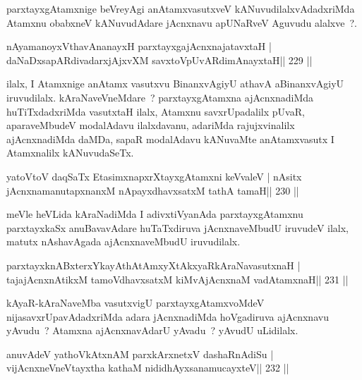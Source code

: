\begin{artha}
parxtayxgAtamxnige beVreyAgi anAtamxvasutxveV kANuvudilalxvAdadxriMda Atamxnu obabxneV kANuvudAdare jAcnxnavu apUNaRveV Aguvudu alalxve~?.
\end{artha}


\begin{shl}
nAyamanoyxV\s thavA\s nanayxH parxtayxgajAcnxnajatavxtaH |
daNaDxsapARdivadarxjAjxvXM savxtoV\s pUvARdimAnayxtaH\hfill || 229 ||
\end{shl}

\begin{artha}
ilalx, I Atamxnige anAtamx vasutxvu BinanxvAgiyU athavA aBinanxvAgiyU iruvudilalx. kAraNaveVneMdare~? parxtayxgAtamxna ajAcnxnadiMda huTiTxdadxriMda vasutxtaH ilalx, Atamxnu savxrUpadalilx pUvaR, aparaveMbudeV modalAdavu ilalxdavanu, adariMda rajujxvinalilx ajAcnxnadiMda daMDa, sapaR modalAdavu kANuvaMte anAtamxvasutx I Atamxnalilx kANuvudaSeTx.
\end{artha}

\begin{shl}
yatoV\s toV daqSaTx EtasimxnapxrXtayxgAtamxni keVvaleV |
nAsitx jAcnxnamanutapxnanxM nApayxdhavxsatxM tathA tamaH\hfill || 230 ||
\end{shl}

\begin{artha}
meVle heVLida kAraNadiMda I adivxtiVyanAda parxtayxgAtamxnu parxtayxkaSx anuBavavAdare \footnotemark[1]huTaTxdiruva jAcnxnaveMbudU iruvudeV ilalx, matutx nAshavAgada ajAcnxnaveMbudU iruvudilalx.
\end{artha}

\begin{shl}
parxtayxknABxterxYkayAthAtAmxyXtAkxyaRkAraNavasutxnaH |
tajajAcnxnAtikxM tamoV\s dhavxsatxM kiMvA\s jAcnxnaM vadA\s\s tamxnaH\hfill || 231 ||
\end{shl}

\begin{artha}
kAyaR-kAraNaveMba vasutxvigU parxtayxgAtamxvoMdeV nijasavxrUpavAdadxriMda adara jAcnxnadiMda hoVgadiruva ajAcnxnavu yAvudu~? Atamxna ajAcnxnavAdarU yAvadu~? yAvudU uLidilalx.
\end{artha}


\begin{shl}
anuvAdeV yathoVkAtxnAM parxkArxnetxV dashaRnAdiSu |
vijAcnxneVneVtayxtha kathaM nididhAyxsanamucayxteV\hfill || 232 ||
\end{shl}


